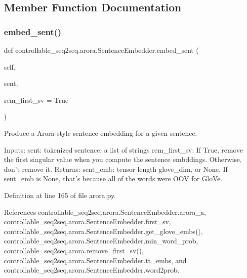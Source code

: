 \subsection{Member Function Documentation}
\mbox{\label{classcontrollable__seq2seq_1_1arora_1_1SentenceEmbedder_a1a24583e505d601696f51d5e5a0a3182}} 
\subsubsection{\texorpdfstring{embed\+\_\+sent()}{embed\_sent()}}
{\footnotesize\ttfamily def controllable\+\_\+seq2seq.\+arora.\+Sentence\+Embedder.\+embed\+\_\+sent (\begin{DoxyParamCaption}\item[{}]{self,  }\item[{}]{sent,  }\item[{}]{rem\+\_\+first\+\_\+sv = {\ttfamily True} }\end{DoxyParamCaption})}

\begin{DoxyVerb}Produce a Arora-style sentence embedding for a given sentence.

Inputs:
  sent: tokenized sentence; a list of strings
  rem_first_sv: If True, remove the first singular value when you compute the
    sentence embddings. Otherwise, don't remove it.
Returns:
  sent_emb: tensor length glove_dim, or None.
      If sent_emb is None, that's because all of the words were OOV for GloVe.
\end{DoxyVerb}
 

Definition at line 165 of file arora.\+py.



References controllable\+\_\+seq2seq.\+arora.\+Sentence\+Embedder.\+arora\+\_\+a, controllable\+\_\+seq2seq.\+arora.\+Sentence\+Embedder.\+first\+\_\+sv, controllable\+\_\+seq2seq.\+arora.\+Sentence\+Embedder.\+get\+\_\+glove\+\_\+embs(), controllable\+\_\+seq2seq.\+arora.\+Sentence\+Embedder.\+min\+\_\+word\+\_\+prob, controllable\+\_\+seq2seq.\+arora.\+remove\+\_\+first\+\_\+sv(), controllable\+\_\+seq2seq.\+arora.\+Sentence\+Embedder.\+tt\+\_\+embs, and controllable\+\_\+seq2seq.\+arora.\+Sentence\+Embedder.\+word2prob.

